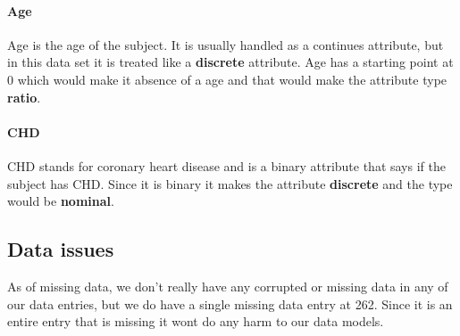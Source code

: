 \paragraph{Age} Age is the age of the subject. It is usually handled as a continues attribute, but in this data set it is treated like a \textbf{discrete} attribute. Age has a starting point at 0 which would make it absence of a age and that would make the attribute type \textbf{ratio}.

\paragraph{CHD} CHD stands for coronary heart disease and is a binary attribute that says if the subject has CHD. Since it is binary it makes the attribute \textbf{discrete} and the type would be \textbf{nominal}.

\subsection{Data issues}

As of missing data, we don't really have any corrupted or missing data in any of our data entries, but we do have a single missing data entry at 262. Since it is an entire entry that is missing it wont do any harm to our data models.